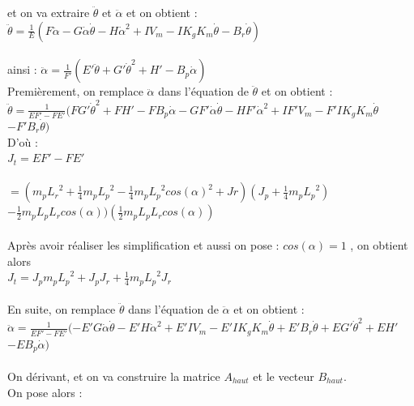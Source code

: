 \documentclass[12pt, a4paper, openany]{report}
\begin{document}
et on va extraire $\ddot{\theta }$ et $\ddot{\alpha}$ et on obtient :\\

 $\ddot{\theta }=\frac{1}{E}(F\ddot{\alpha}-G\dot{\alpha}\dot{\theta}-H\dot{\alpha}^2+IV_{m}-IK_{g}K_{m}\dot{\theta}-B_{r}\dot{\theta})$\\\\
   ainsi :
   $\ddot{\alpha}=\frac{1}{{F}'}({E}'\ddot{\theta}+{G}'\dot{\theta}^2+{H}'-B_{p}\dot{\alpha})$ \\


 Premièrement, on remplace $\ddot{\alpha}$ dans l'équation de $\ddot{\theta}$ et on obtient :\\ 


$\ddot{\theta}=\frac{1}{E{F}'-F{E}'}(F{G}'\dot{\theta}^2+F{H}'-FB_{p}\dot{\alpha}-G{F}'\dot{\alpha}\dot{\theta}-H{F}'\dot{\alpha}^2+I{F}'V_{m}-{F}'IK_{g}K_{m}\dot{\theta}$\\$-{F}'B_{r}\dot{\theta})$\\ 

D'où :\\

$J_{t} = E{F}'-F{E}'$\\\\ $=(m_{p}{L_{r}}^2+\frac{1}{4}m_{p}{L_{p}}^2-\frac{1}{4}m_{p}{L_{p}}^2cos({\alpha})^2+Jr)(J_{p}+\frac{1}{4}m_{p}{L_{p}}^2)$\\
$-\frac{1}{2}m_{p}L_{p}L_{r}cos(\alpha))(\frac{1}{2}m_{p}L_{p}L_{r}cos(\alpha))$\\\\


Après avoir réaliser les simplification et aussi on pose :  $cos(\alpha)=1$ , on obtient alors \\


     $J_{t}=J_{p}m_{p}{L_{p}}^2+J_{p}J_{r}+\frac{1}{4}m_{p}{L_{p}}^2J_{r}$\\\\


 En suite, on remplace $\ddot{\theta}$ dans l'équation de $\ddot{\alpha}$ et on obtient :\\

    $\ddot{\alpha}=\frac{1}{E{F}'-F{E}'}(-{E}'G\dot{\alpha}\dot{\theta}-{E}'H\dot{\alpha}^2+{E}'IV_{m}-{E}'IK_{g}K_{m}\dot{\theta}+{E}'B_{r}\dot{\theta}+E{G}'\dot{\theta}^2+E{H}'$\\$-EB_{p}\dot{\alpha})$\\\\


On dérivant, et on va construire la matrice $A_{haut}$ et le vecteur $B_{haut}$.\\
On pose alors :\\
\end{document}

